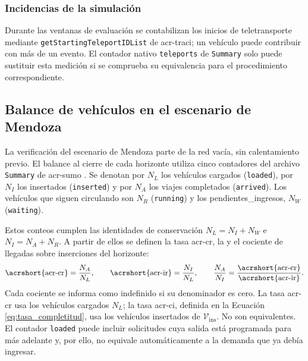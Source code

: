 \subsubsection{Incidencias de la simulación}
\label{subsec:incidencias_simulacion}

Durante las ventanas de evaluación se contabilizan los inicios de teletransporte mediante \texttt{getStarting}\allowbreak\texttt{TeleportIDList} de \acrshort{acr-traci}; un vehículo puede contribuir con más de un evento. El contador nativo \texttt{teleports} de \texttt{Summary} solo puede sustituir esta medición si se comprueba su equivalencia para el procedimiento correspondiente.

\subsection{Balance de vehículos en el escenario de Mendoza}
\label{subsec:balance_vehiculos_mendoza}

La verificación del escenario de Mendoza parte de la red vacía, sin calentamiento previo. El balance al cierre de cada horizonte utiliza cinco contadores del archivo \texttt{Summary} de \acrshort{acr-sumo} \cite{SUMO2026_Summary}. Se denotan por $N_L$ los vehículos cargados (\texttt{loaded}), por $N_I$ los insertados (\texttt{inserted}) y por $N_A$ los viajes completados (\texttt{arrived}). Los vehículos que siguen circulando son $N_R$ (\texttt{running}) y los \glspl{pendientes_ingreso}, $N_W$ (\texttt{waiting}).

Estos conteos cumplen las identidades de conservación $N_L = N_I + N_W$ e $N_I = N_A + N_R$. A partir de ellos se definen la tasa \acrshort{acr-cr}, la  y el cociente de llegadas sobre inserciones del horizonte:
\begin{equation}
    \text{\acrshort{acr-cr}} = \frac{N_A}{N_L}, \qquad
    \text{\acrshort{acr-ir}} = \frac{N_I}{N_L}, \qquad
    \frac{N_A}{N_I} = \frac{\text{\acrshort{acr-cr}}}{\text{\acrshort{acr-ir}}}.
    \label{eq:tasas_operacionales}
\end{equation}
Cada cociente se informa como indefinido si su denominador es cero. La tasa \acrshort{acr-cr} usa los vehículos cargados $N_L$; la tasa \acrshort{acr-ci}, definida en la Ecuación \eqref{eq:tasa_completitud}, usa los vehículos insertados de $\mathcal{V}_{\mathrm{ins}}$. No son equivalentes. El contador \texttt{loaded} puede incluir solicitudes cuya salida está programada para más adelante y, por ello, no equivale automáticamente a la demanda que ya debía ingresar.


